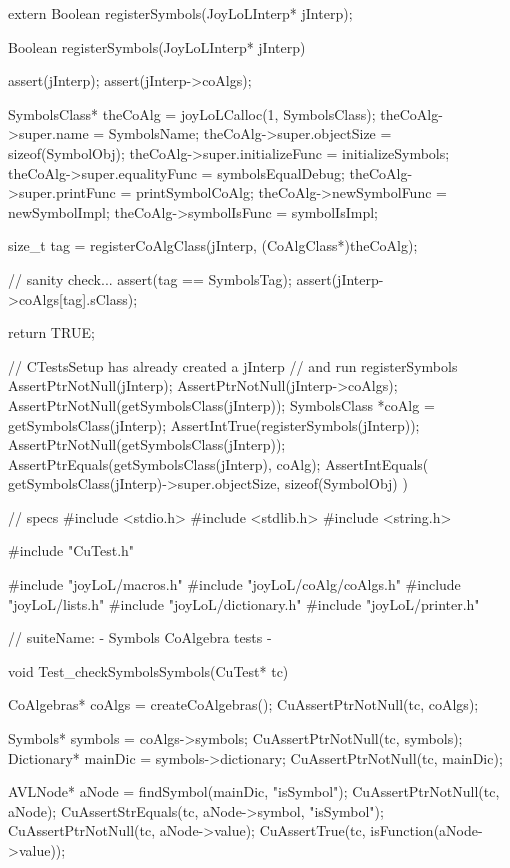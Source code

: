 \startCHeader
extern Boolean registerSymbols(JoyLoLInterp* jInterp);
\stopCHeader
{}

\startCCode
Boolean registerSymbols(JoyLoLInterp* jInterp) {
  assert(jInterp);
  assert(jInterp->coAlgs);
  
  SymbolsClass* theCoAlg = joyLoLCalloc(1, SymbolsClass);
  theCoAlg->super.name           = SymbolsName;
  theCoAlg->super.objectSize     = sizeof(SymbolObj);
  theCoAlg->super.initializeFunc = initializeSymbols;
  theCoAlg->super.equalityFunc   = symbolsEqualDebug;
  theCoAlg->super.printFunc      = printSymbolCoAlg;
  theCoAlg->newSymbolFunc        = newSymbolImpl;
  theCoAlg->symbolIsFunc         = symbolIsImpl;

  size_t tag =
    registerCoAlgClass(jInterp, (CoAlgClass*)theCoAlg);
  
  // sanity check...
  assert(tag == SymbolsTag);
  assert(jInterp->coAlgs[tag].sClass);

  return TRUE;
}
\stopCCode


\startCTest
  // CTestsSetup has already created a jInterp
  // and run registerSymbols
  AssertPtrNotNull(jInterp);
  AssertPtrNotNull(jInterp->coAlgs);
  AssertPtrNotNull(getSymbolsClass(jInterp));
  SymbolsClass *coAlg = getSymbolsClass(jInterp);
  AssertIntTrue(registerSymbols(jInterp));
  AssertPtrNotNull(getSymbolsClass(jInterp));
  AssertPtrEquals(getSymbolsClass(jInterp), coAlg);
  AssertIntEquals(
    getSymbolsClass(jInterp)->super.objectSize,
    sizeof(SymbolObj)
  )
\stopCTest
\stopTestCase
\stopTestSuite


\starttyping
// specs
#include <stdio.h>
#include <stdlib.h>
#include <string.h>

#include "CuTest.h"

#include "joyLoL/macros.h"
#include "joyLoL/coAlg/coAlgs.h"
#include "joyLoL/lists.h"
#include "joyLoL/dictionary.h"
#include "joyLoL/printer.h"

// suiteName: - Symbols CoAlgebra tests -

void Test_checkSymbolsSymbols(CuTest* tc) {
  CoAlgebras* coAlgs = createCoAlgebras();
  CuAssertPtrNotNull(tc, coAlgs);

  Symbols* symbols = coAlgs->symbols;
  CuAssertPtrNotNull(tc, symbols);
  Dictionary* mainDic = symbols->dictionary;
  CuAssertPtrNotNull(tc, mainDic);

  AVLNode* aNode = findSymbol(mainDic, "isSymbol");
  CuAssertPtrNotNull(tc, aNode);
  CuAssertStrEquals(tc, aNode->symbol, "isSymbol");
  CuAssertPtrNotNull(tc, aNode->value);
  CuAssertTrue(tc, isFunction(aNode->value));
}
\stoptyping